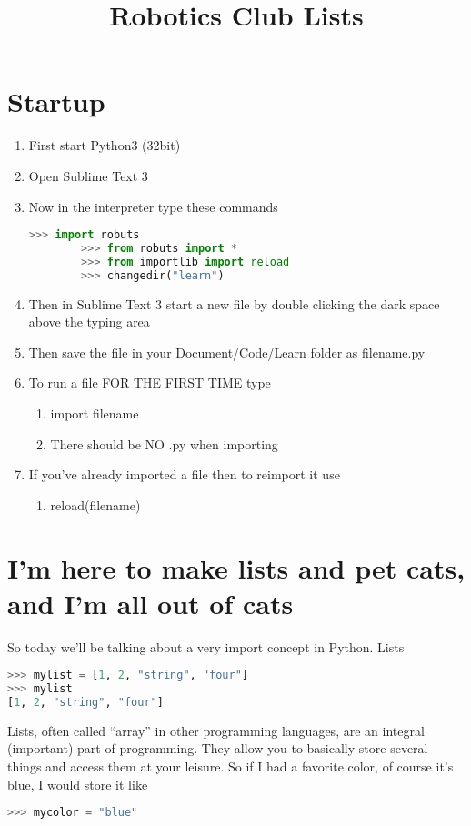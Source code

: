 \documentclass{article}
\title{Robotics Club Lists}
\begin{document}
\section{Startup}
\begin{enumerate}
	\item First start Python3 (32bit)
    \item Open Sublime Text 3
    \item Now in the interpreter type these commands
    \begin{lstlisting}[language=Python]
    	>>> import robuts
        >>> from robuts import *
        >>> from importlib import reload
        >>> changedir("learn")
   \end{lstlisting}

   \item Then in Sublime Text 3 start a new file by double clicking the dark space above the typing area
   \item Then save the file in your Document/Code/Learn folder as filename.py
   \item To run a file FOR THE FIRST TIME type
  \begin{enumerate}
      \item import filename
      \item There should be NO .py when importing
   \end{enumerate}
   \item If you've already imported a file then to reimport it use
   \begin{enumerate}
		\item reload(filename)
   \end{enumerate}
\end{enumerate}	

\section{I'm here to make lists and pet cats, and I'm all out of cats}
So today we'll be talking about a very import concept in Python. 
Lists

\begin{lstlisting}[language=Python]
>>> mylist = [1, 2, "string", "four"]
>>> mylist
[1, 2, "string", "four"]
\end{lstlisting}

Lists, often called ``array'' in other programming languages, are an integral (important) part of 
programming. 
They allow you to basically store several things and access them at your leisure. 
So if I had a favorite color, of course it's blue, I would store it like
\begin{lstlisting}[language=Python]
>>> mycolor = "blue"
\end{lstlisting}
\end{document}
